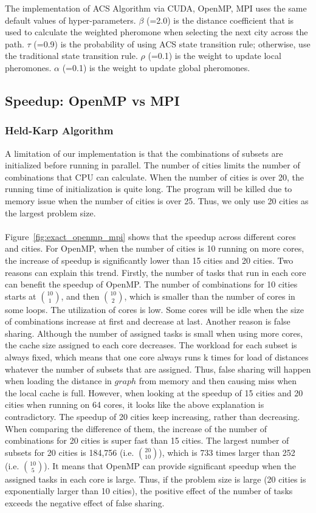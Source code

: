 \documentclass{article}
\begin{document}
The implementation of ACS Algorithm via CUDA, OpenMP, MPI uses the same default values of hyper-parameters. $\beta$ (=2.0) is the distance coefficient that is used to calculate the weighted pheromone when selecting the next city across the path. $\tau$ (=0.9) is the probability of using ACS state transition rule; otherwise, use the traditional state transition rule. $\rho$ (=0.1) is the weight to update local pheromones. $\alpha$ (=0.1) is the weight to update global pheromones.




\subsection{Speedup: OpenMP vs MPI}
\subsubsection{Held-Karp Algorithm}
    A limitation of our implementation is that the combinations of subsets are initialized before running in parallel. The number of cities limits the number of combinations that CPU can calculate. When the number of cities is over 20, the running time of initialization is quite long. The program will be killed due to memory issue when the number of cities is over 25. Thus, we only use 20 cities as the largest problem size.\\\\
    Figure~\ref{fig:exact_openmp_mpi} shows that the speedup across different cores and cities. For OpenMP, when the number of cities is 10 running on more cores, the increase of speedup is significantly lower than 15 cities and 20 cities. Two reasons can explain this trend. Firstly, the number of tasks that run in each core can benefit the speedup of OpenMP. The number of combinations for 10 cities starts at ${10\choose1}$, and then ${10\choose2}$, which is smaller than the number of cores in some loops. The utilization of cores is low. Some cores will be idle when the size of combinations increase at first and decrease at last. Another reason is false sharing. Although the number of assigned tasks is small when using more cores, the cache size assigned to each core decreases. The workload for each subset is always fixed, which means that one core always runs k times for load of distances whatever the number of subsets that are assigned. Thus, false sharing will happen when loading the distance in $graph$ from memory and then causing miss when the local cache is full. However, when looking at the speedup of 15 cities and 20 cities when running on 64 cores, it looks like the above explanation is contradictory. The speedup of 20 cities keep increasing, rather than decreasing. When comparing the difference of them, the increase of the number of combinations for 20 cities is super fast than 15 cities. The largest number of subsets for 20 cities is 184,756 (i.e. ${20\choose10}$), which is 733 times larger than 252 (i.e. ${10\choose5}$). It means that OpenMP can provide significant speedup when the assigned tasks in each core is large. Thus, if the problem size is large (20 cities is exponentially larger than 10 cities), the positive effect of the number of tasks exceeds the negative effect of false sharing.\\\\
\end{document}
